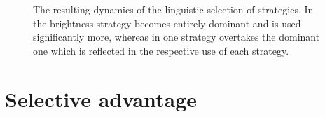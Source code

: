 \begin{figure}[htbp]
\begin{center}
\end{center}
\caption[Resulting dynamics of the linguistic selection of
strategies]{The resulting dynamics of the linguistic selection of
  strategies. In  the brightness
    strategy becomes entirely dominant and is used significantly
  more, whereas in  one strategy overtakes
  the dominant one which is reflected in the respective use of each
  strategy.}
\label{f:ls-dynamics}
\end{figure}

\section{Selective advantage}
\label{s:ls-selective-advantage}

